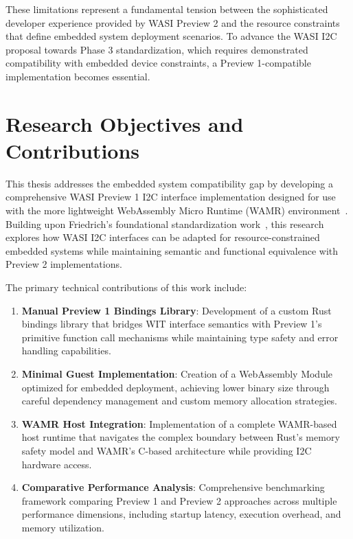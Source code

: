 These limitations represent a fundamental tension between the sophisticated developer experience provided by WASI Preview 2 and the resource constraints that define embedded system deployment scenarios. To advance the WASI I2C proposal towards Phase 3 standardization, which requires demonstrated compatibility with embedded device constraints, a Preview 1-compatible implementation becomes essential.

\section{Research Objectives and Contributions}
\label{sec:research-objectives}

This thesis addresses the embedded system compatibility gap by developing a comprehensive WASI Preview 1 I2C interface implementation designed for use with the more lightweight WebAssembly Micro Runtime (WAMR) environment~\cite{wamr_project}. Building upon Friedrich's foundational standardization work~\cite{friedrich_paper}, this research explores how WASI I2C interfaces can be adapted for resource-constrained embedded systems while maintaining semantic and functional equivalence with Preview 2 implementations.

The primary technical contributions of this work include:

\begin{enumerate}
    \item \textbf{Manual Preview 1 Bindings Library}: Development of a custom Rust bindings library that bridges WIT interface semantics with Preview 1's primitive function call mechanisms while maintaining type safety and error handling capabilities.
    
    \item \textbf{Minimal Guest Implementation}: Creation of a WebAssembly Module optimized for embedded deployment, achieving lower binary size through careful dependency management and custom memory allocation strategies.
    
    \item \textbf{WAMR Host Integration}: Implementation of a complete WAMR-based host runtime that navigates the complex boundary between Rust's memory safety model and WAMR's C-based architecture while providing I2C hardware access.
    
    \item \textbf{Comparative Performance Analysis}: Comprehensive benchmarking framework comparing Preview 1 and Preview 2 approaches across multiple performance dimensions, including startup latency, execution overhead, and memory utilization.
\end{enumerate}

